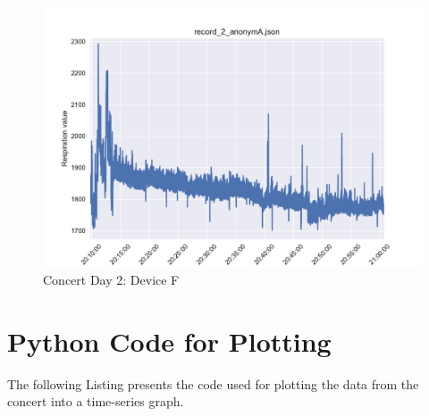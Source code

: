 \begin{figure}
    \centering
    \includegraphics[scale=0.6]{images/record_2_f.pdf}
    \caption{Concert Day 2: Device F}
    \label{fig:concert_day2_f}
\end{figure}

\newpage
\section{Python Code for Plotting}
The following Listing presents the code used for plotting the data from the concert into a time-series graph. 

